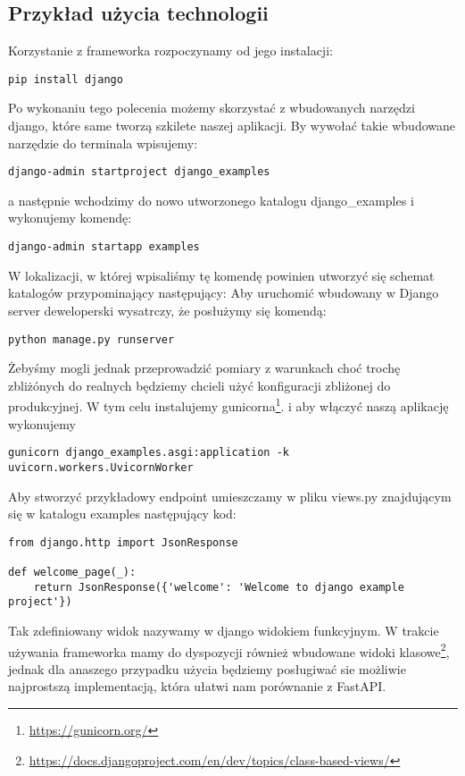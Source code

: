 \subsection{Przykład użycia technologii}
Korzystanie z frameworka rozpoczynamy od jego instalacji:
\begin{lstlisting}
pip install django
\end{lstlisting}
Po wykonaniu tego polecenia możemy skorzystać z wbudowanych narzędzi django, które same tworzą szkilete naszej aplikacji. By wywołać takie wbudowane narzędzie do terminala wpisujemy:
\begin{lstlisting}
django-admin startproject django_examples
\end{lstlisting}
a następnie wchodzimy do nowo utworzonego katalogu django\_examples i wykonujemy komendę:
\begin{lstlisting}
django-admin startapp examples
\end{lstlisting}

W lokalizacji, w której wpisaliśmy tę komendę powinien utworzyć się schemat katalogów przypominający następujący:
Aby uruchomić wbudowany w Django server deweloperski wysatrczy, że posłużymy się komendą:
\begin{lstlisting}
python manage.py runserver
\end{lstlisting}
Żebyśmy mogli jednak przeprowadzić pomiary z warunkach choć trochę zbliżónych do realnych będziemy chcieli użyć konfiguracji zbliżonej do produkcyjnej. W tym celu instalujemy gunicorna\footnote{\url{https://gunicorn.org/}}. i aby włączyć naszą aplikację wykonujemy 
\begin{lstlisting}
gunicorn django_examples.asgi:application -k uvicorn.workers.UvicornWorker
\end{lstlisting}

Aby stworzyć przykładowy endpoint umieszczamy w pliku views.py znajdującym się w katalogu examples następujący kod:
\begin{lstlisting}
from django.http import JsonResponse

def welcome_page(_):
    return JsonResponse({'welcome': 'Welcome to django example project'})
\end{lstlisting}
Tak zdefiniowany widok nazywamy w django widokiem funkcyjnym. W trakcie używania frameworka mamy do dyspozycji również wbudowane widoki klasowe\footnote{\url{https://docs.djangoproject.com/en/dev/topics/class-based-views/}}, jednak dla anaszego przypadku użycia będziemy posługiwać sie możliwie najprostszą implementacją, która ułatwi nam porównanie z FastAPI.

